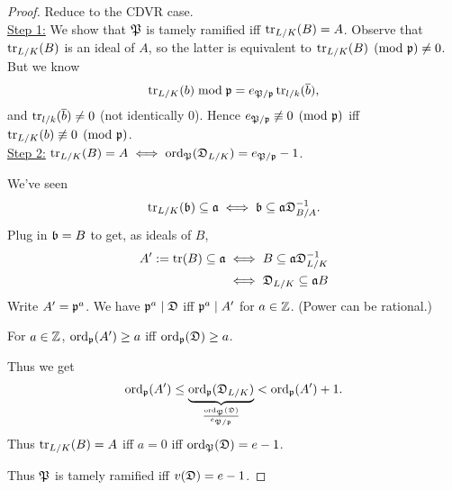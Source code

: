 \begin{proof}
Reduce to the CDVR case.\\

\noindent\underline{Step 1:} We show that $\mP$ is tamely ramified iff $\tr_{L/K}(B)=A$. Observe that $\tr_{L/K}(B)$ is an ideal of $A$, so the latter is equivalent to $\tr_{L/K}(B)\pmod{\mfp}\ne 0$. But we know
\[
\tr_{L/K}(b)\bmod{\mfp} = e_{\mpp} \tr_{l/k} (\ol b),
\]
and $\tr_{l/k}(\ol b)\ne 0$ (not identically 0). Hence $e_{\mpp}\nequiv 0\pmod{\mfp}$ iff $\tr_{L/K}(b)\nequiv 0\pmod{\mfp}$.\\

\noindent\underline{Step 2:} $\tr_{L/K}(B)=A\iff \ord_{\mP}(\mD_{L/K})=e_{\mpp}-1$.

We've seen 
\[
\tr_{L/K}(\mb)\subeq \ma\iff \mb\subeq \ma\mD_{B/A}^{-1}.
\]
Plug in $\mb=B$ to get, as ideals of $B$,
\begin{align*}
A':=\tr(B)\subeq \ma&\iff B\subeq \ma\mD_{L/K}^{-1}\\
&\iff \mD_{L/K} \subeq \ma B
\end{align*}
Write $A'=\mfp^{a}$. We have $\mfp^a\mid \mD$ iff $\mfp^a\mid A'$ for $a\in \Z$. (Power can be rational.)

For $a\in \Z$, $\ord_{\mfp}(A')\ge a$ iff $\ord_{\mfp}(\mD)\ge a$.

Thus we get
\[
\ord_{\mfp}(A')\le 
\underbrace{\ord_{\mfp}(\mD_{L/K})}_{\fc{\ord_{\mP}(\mD)}{e_{\mpp}}}
<\ord_{\mfp}(A')+1.
\]
Thus $\tr_{L/K}(B)=A$ iff $a=0$ iff $\ord_{\mP}(\mD)=e-1$.

Thus $\mP$ is tamely ramified iff $v(\mD)=e-1$.
\end{proof}
